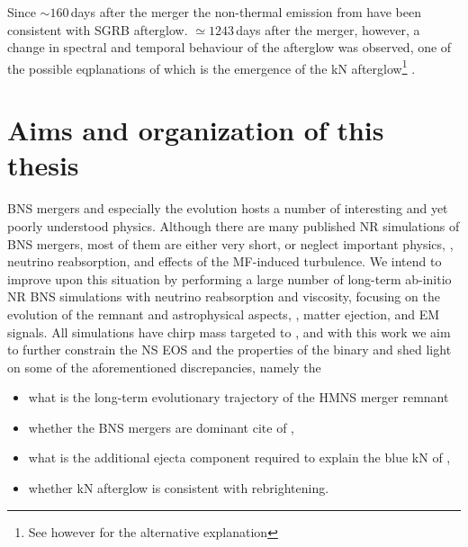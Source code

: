 Since ${\sim}160\,$days after the merger the non-thermal emission from \GW{} have been 
consistent with \ac{SGRB} afterglow. ${\simeq}1243\,$days after the merger, however, a 
change in spectral and temporal behaviour of the afterglow was observed, one of the 
possible eqplanations of which is the emergence of the \ac{kN} afterglow\footnote{
    See however \citet{Troja:2021xsw} for the alternative explanation
} \citep{Hajela:2021faz}.




\section{Aims and organization of this thesis}

\ac{BNS} mergers and especially the \pmerg{} evolution hosts a number of interesting 
and yet poorly understood physics. Although there are many published \ac{NR} simulations of \ac{BNS} mergers, 
most of them are either very short, or neglect important physics, \eg, neutrino reabsorption, 
and effects of the \ac{MF}-induced turbulence. 
%
We intend to improve upon this situation by performing a large number of long-term ab-initio 
\ac{NR} \ac{BNS} simulations with neutrino reabsorption and viscosity, focusing on the 
\pmerg{} evolution of the remnant and astrophysical aspects, \ie, matter ejection, 
\rproc{} \nuc{} and \ac{EM} signals. 
%
All simulations have chirp mass targeted to \GW{}, and with this work we aim to further 
constrain the \ac{NS} \ac{EOS} and the properties of the binary and shed light on 
some of the aforementioned discrepancies, namely the 
\begin{itemize}
    \item what is the long-term evolutionary trajectory of the \ac{HMNS} merger remnant
    \item whether the \ac{BNS} mergers are dominant cite of \rproc{}, 
    \item what is the additional ejecta component required to explain the blue \ac{kN} of \AT{}, 
    \item whether \ac{kN} afterglow is consistent with \GRB{} rebrightening.
\end{itemize}

